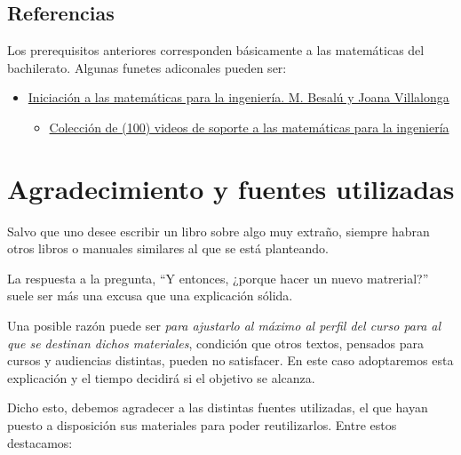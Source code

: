 \documentclass[
  a4paper,
  DIV=11,
  numbers=noendperiod]{scrreprt}
\providecommand{\tightlist}{%
  \setlength{\itemsep}{0pt}\setlength{\parskip}{0pt}}\usepackage{longtable,booktabs,array}
\begin{document}
\section*{Referencias}\label{referencias}


Los prerequisitos anteriores corresponden básicamente a las matemáticas
del bachilerato. Algunas funetes adiconales pueden ser:

\begin{itemize}
\item
  \href{http://cimanet.uoc.edu/cursMates0/IniciacionMatematicas/pdf/PID_00273914.pdf}{Iniciación
  a las matemáticas para la ingeniería. M. Besalú y Joana Villalonga}

  \begin{itemize}
  \tightlist
  \item
    \href{https://www.youtube.com/playlist?list=PLv8FweHfYYMo6Lr2zt6H4znq5KuBacq28}{Colección
    de (100) videos de soporte a las matemáticas para la ingeniería}
  \end{itemize}
\end{itemize}


\chapter*{Agradecimiento y fuentes
utilizadas}\label{agradecimiento-y-fuentes-utilizadas}


Salvo que uno desee escribir un libro sobre algo muy extraño, siempre
habran otros libros o manuales similares al que se está planteando.

La respuesta a la pregunta, ``Y entonces, ¿porque hacer un nuevo
matrerial?'' suele ser más una excusa que una explicación sólida.

Una posible razón puede ser \emph{para ajustarlo al máximo al perfil del
curso para al que se destinan dichos materiales}, condición que otros
textos, pensados para cursos y audiencias distintas, pueden no
satisfacer. En este caso adoptaremos esta explicación y el tiempo
decidirá si el objetivo se alcanza.

Dicho esto, debemos agradecer a las distintas fuentes utilizadas, el que
hayan puesto a disposición sus materiales para poder reutilizarlos.
Entre estos destacamos:
\end{document}
